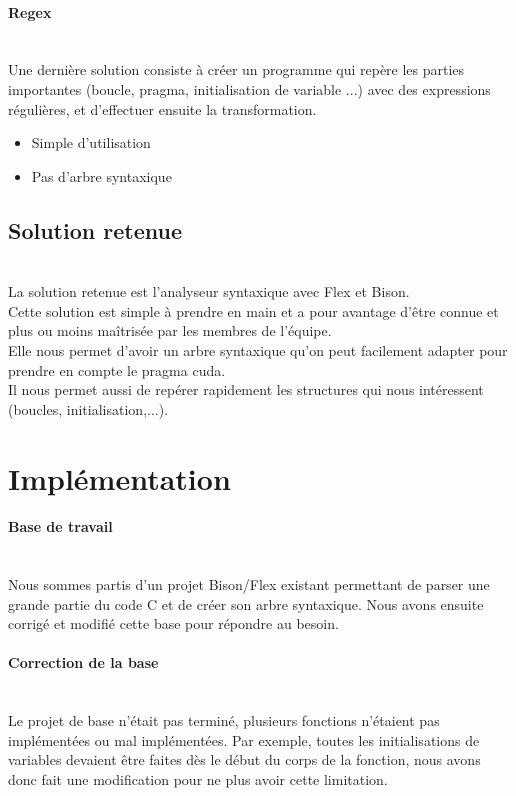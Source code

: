 \documentclass{article}
\begin{document}
	
	\paragraph{Regex}
	~~\\
	\indent
	Une dernière solution consiste à créer un programme qui repère les parties importantes (boucle, pragma, initialisation de variable ...) avec des expressions régulières, et d'effectuer ensuite la transformation.
	\begin{itemize}
		\item Simple d'utilisation
		\item Pas d'arbre syntaxique
	\end{itemize}
		
	
	\subsection{Solution retenue}
	~~\\
	\indent
	La solution retenue est l'analyseur syntaxique avec Flex et Bison. \\Cette solution est simple à prendre en main et a pour avantage d'être connue et plus ou moins maîtrisée par les membres de l'équipe. \\Elle nous permet d'avoir un arbre syntaxique qu'on peut facilement adapter pour prendre en compte le pragma cuda. \\Il nous permet aussi de repérer rapidement les structures qui nous intéressent (boucles, initialisation,...).

	
	\newpage
	
	
	
	
	\section{Implémentation}
	
	\paragraph{Base de travail}
	~~\\
	\indent
	Nous sommes partis d'un projet Bison/Flex existant permettant de parser une grande partie du code C et de créer son arbre syntaxique. Nous avons ensuite corrigé et modifié cette base pour répondre au besoin.
	
	\paragraph{Correction de la base}
	~~\\
	\indent
	Le projet de base n'était pas terminé, plusieurs fonctions n'étaient pas implémentées ou mal implémentées. Par exemple, toutes les initialisations de variables devaient être faites dès le début du corps de la fonction, nous avons donc fait une modification pour ne plus avoir cette limitation.
	
\end{document}
